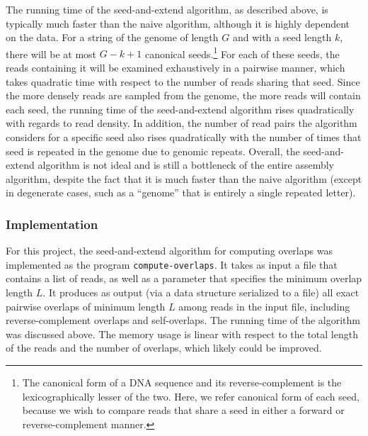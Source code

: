 \documentclass[10pt]{article}
\begin{document}
The running time of the seed-and-extend algorithm, as described above, is
typically much faster than the naive algorithm, although it is highly dependent
on the data.  For a string of the genome of length $G$ and with a seed length
$k$, there will be at most $G-k+1$ canonical seeds.\footnote{The canonical form
of a DNA sequence and its reverse-complement is the lexicographically lesser of
the two.  Here, we refer canonical form of each seed, because we wish to compare
reads that share a seed in either a forward or reverse-complement manner.}  For
each of these seeds, the reads containing it will be examined exhaustively in a
pairwise manner, which takes quadratic time with respect to the number of reads
sharing that seed.  Since the more densely reads are sampled from the genome,
the more reads will contain each seed,  the running time of the seed-and-extend
algorithm rises quadratically with regards to read density.  In addition, the
number of read pairs the algorithm considers for a specific seed also rises
quadratically with the number of times that seed is repeated in the genome due
to genomic repeats.  Overall, the seed-and-extend algorithm is not ideal and is
still a bottleneck of the entire assembly algorithm, despite the fact that it is
much faster than the naive algorithm (except in degenerate cases, such as a
``genome'' that is entirely a single repeated letter).

\subsubsection{Implementation}

For this project, the seed-and-extend algorithm for computing overlaps was
implemented as the program {\tt compute-overlaps}.  It takes as input a file
that contains a list of reads, as well as a parameter that specifies the minimum
overlap length $L$.  It produces as output (via a data structure serialized to a
file) all exact pairwise overlaps of minimum length $L$ among reads in the input
file, including reverse-complement overlaps and self-overlaps.  The running time
of the algorithm was discussed above.  The memory usage is linear with respect
to the total length of the reads and the number of overlaps, which likely could
be improved.
\end{document}
